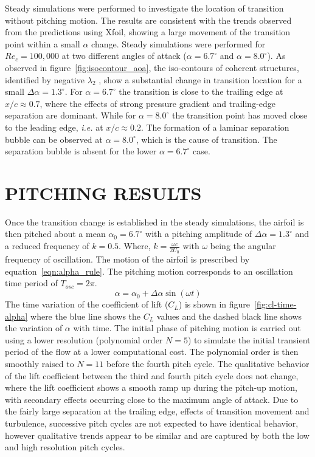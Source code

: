 \documentclass[twocolumn,10pt]{tsfp}
\begin{document}
Steady simulations were performed to investigate the location of transition without pitching motion. The results are consistent with the trends observed from the predictions using Xfoil, showing a large movement of the transition point within a small $\alpha$ change. Steady simulations were performed for $Re_{c}=100,000$ at two different angles of attack ($\alpha=6.7^{\circ}$ and $\alpha=8.0^{\circ}$). As observed in figure~\ref{fig:isocontour_aoa}, the iso-contours of coherent structures, identified by negative $\lambda_{2}$ \citep{jeong95}, show a substantial change in transition location for a small $\Delta\alpha=1.3^{\circ}$. For $\alpha=6.7^{\circ}$ the transition is close to the trailing edge at $x/c\approx0.7$, where the effects of strong pressure gradient and trailing-edge separation are dominant. While for $\alpha=8.0^{\circ}$ the transition point has moved close to the leading edge, \emph{i.e.} at $x/c\approx0.2$. The formation of a laminar separation bubble can be observed at $\alpha=8.0^{\circ}$, which is the cause of transition. The separation bubble is absent for the lower $\alpha=6.7^{\circ}$ case.
\section*{PITCHING RESULTS}

Once the transition change is established in the steady simulations, the airfoil is then pitched about a mean $\alpha_{0}=6.7^{\circ}$ with a pitching amplitude of $\Delta\alpha=1.3^{\circ}$ and a reduced frequency of $k=0.5$. Where, $k=\frac{\omega c}{2U_{0}}$ with $\omega$ being the angular frequency of oscillation. The motion of the airfoil is prescribed by equation~\ref{eqn:alpha_rule}. The pitching motion corresponds to an oscillation time period of $T_{osc}=2\pi$.
\begin{equation}
\alpha = \alpha_{0} + \Delta\alpha\sin(\omega t)
\label{eqn:alpha_rule}
\end{equation}
The time variation of the coefficient of lift ($C_{L}$) is shown in figure~\ref{fig:cl-time-alpha} where the blue line shows the $C_{L}$ values and the dashed black line shows the variation of $\alpha$ with time. The initial phase of pitching motion is carried out using a lower resolution (polynomial order $N=5$) to simulate the initial transient period of the flow at a lower computational cost. The polynomial order is then smoothly raised to $N=11$ before the fourth pitch cycle. The qualitative behavior of the lift coefficient between the third and fourth pitch cycle does not change, where the lift coefficient shows a smooth ramp up during the pitch-up motion, with secondary effects occurring close to the maximum angle of attack. Due to the fairly large separation at the trailing edge, effects of transition movement and turbulence, successive pitch cycles are not expected to have identical behavior, however qualitative trends appear to be similar and are captured by both the low and high resolution pitch cycles.
\end{document}
